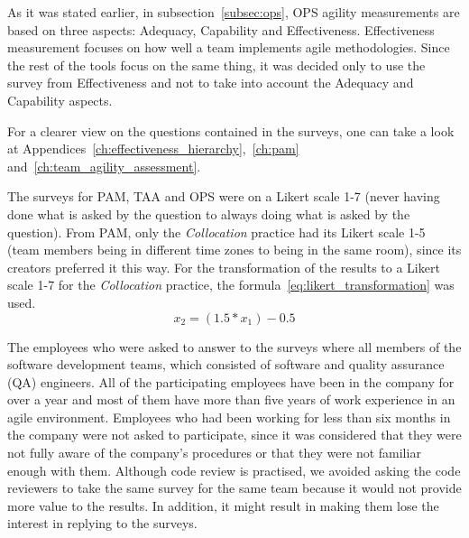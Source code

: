 
As it was stated earlier, in subsection~\ref{subsec:ops}, \ac{OPS} agility measurements are based on three aspects: Adequacy, Capability and Effectiveness. Effectiveness measurement focuses on how well a team implements agile methodologies. Since the rest of the tools focus on the same thing, it was decided only to use the survey from Effectiveness and not to take into account the Adequacy and Capability aspects.

For a clearer view on the questions contained in the surveys, one can take a look at Appendices~\ref{ch:effectiveness_hierarchy},~\ref{ch:pam} and~\ref{ch:team_agility_assessment}.

The surveys for \ac{PAM}, \ac{TAA} and \ac{OPS} were on a Likert scale 1-7 (never having done what is asked by the question to always doing what is asked by the question). From \ac{PAM}, only the \textit{Collocation} practice had its Likert scale 1-5 (team members being in different time zones to being in the same room), since its creators preferred it this way. For the transformation of the results to a Likert scale 1-7 for the \textit{Collocation} practice, the formula~\eqref{eq:likert_transformation} \cite{likert_transformation} was used.  \begin{equation} \label{eq:likert_transformation} x_2 = (1.5 * x_1) - 0.5 \end{equation} 

The employees who were asked to answer to the surveys where all members of the software development teams, which consisted of software and quality assurance (QA) engineers. All of the participating employees have been in the company for over a year and most of them have more than five years of work experience in an agile environment. Employees who had been working for less than six months in the company were not asked to participate, since it was considered that they were not fully aware of the company's procedures or that they were not familiar enough with them. Although code review is practised, we avoided asking the code reviewers to take the same survey for the same team because it would not provide more value to the results. In addition, it might result in making them lose the interest in replying to the surveys. 

